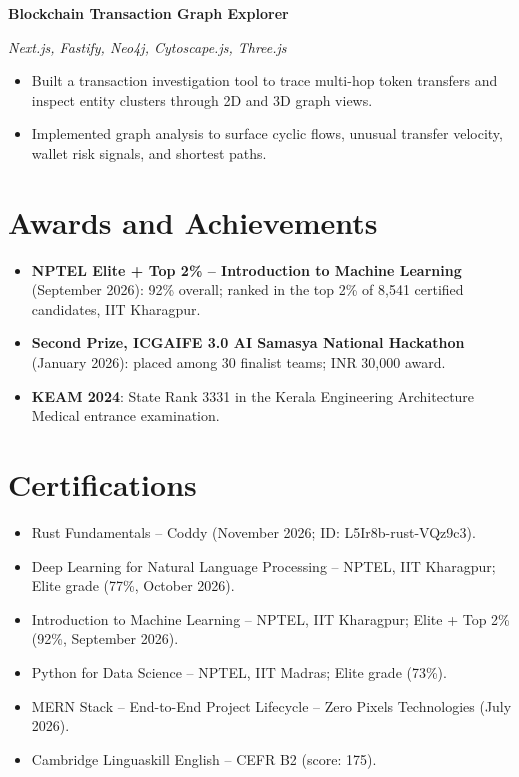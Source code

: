 \documentclass[a4paper,10pt]{article}
\newcommand{\project}[3]{%
  \noindent\textbf{#1}\hfill{\small #2}\par
  {\small\emph{#3}}\par\vspace{-2pt}%
}
\begin{document}
\project{Blockchain Transaction Graph Explorer}{}{Next.js, Fastify, Neo4j, Cytoscape.js, Three.js}
\begin{itemize}
  \item Built a transaction investigation tool to trace multi-hop token transfers and inspect entity clusters through 2D and 3D graph views.
  \item Implemented graph analysis to surface cyclic flows, unusual transfer velocity, wallet risk signals, and shortest paths.
\end{itemize}

\section{Awards and Achievements}
\begin{itemize}
  \item \textbf{NPTEL Elite + Top 2\% -- Introduction to Machine Learning} (September 2026): 92\% overall; ranked in the top 2\% of 8,541 certified candidates, IIT Kharagpur.
  \item \textbf{Second Prize, ICGAIFE 3.0 AI Samasya National Hackathon} (January 2026): placed among 30 finalist teams; INR 30,000 award.
  \item \textbf{KEAM 2024}: State Rank 3331 in the Kerala Engineering Architecture Medical entrance examination.
\end{itemize}

\section{Certifications}
\begin{itemize}
  \item Rust Fundamentals -- Coddy (November 2026; ID: L5Ir8b-rust-VQz9c3).
  \item Deep Learning for Natural Language Processing -- NPTEL, IIT Kharagpur; Elite grade (77\%, October 2026).
  \item Introduction to Machine Learning -- NPTEL, IIT Kharagpur; Elite + Top 2\% (92\%, September 2026).
  \item Python for Data Science -- NPTEL, IIT Madras; Elite grade (73\%).
  \item MERN Stack -- End-to-End Project Lifecycle -- Zero Pixels Technologies (July 2026).
  \item Cambridge Linguaskill English -- CEFR B2 (score: 175).
\end{itemize}
\end{document}
